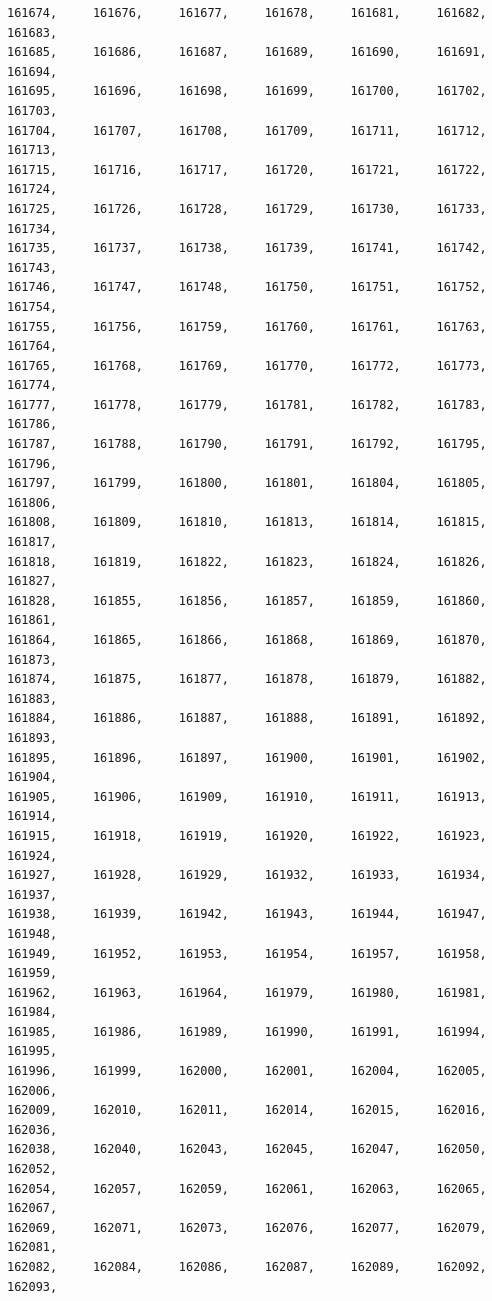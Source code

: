 \documentclass[a4paper,11pt]{report}
\begin{document}
\begin{verbatim}
161674,     161676,     161677,     161678,     161681,     161682,     161683,
161685,     161686,     161687,     161689,     161690,     161691,     161694,
161695,     161696,     161698,     161699,     161700,     161702,     161703,
161704,     161707,     161708,     161709,     161711,     161712,     161713,
161715,     161716,     161717,     161720,     161721,     161722,     161724,
161725,     161726,     161728,     161729,     161730,     161733,     161734,
161735,     161737,     161738,     161739,     161741,     161742,     161743,
161746,     161747,     161748,     161750,     161751,     161752,     161754,
161755,     161756,     161759,     161760,     161761,     161763,     161764,
161765,     161768,     161769,     161770,     161772,     161773,     161774,
161777,     161778,     161779,     161781,     161782,     161783,     161786,
161787,     161788,     161790,     161791,     161792,     161795,     161796,
161797,     161799,     161800,     161801,     161804,     161805,     161806,
161808,     161809,     161810,     161813,     161814,     161815,     161817,
161818,     161819,     161822,     161823,     161824,     161826,     161827,
161828,     161855,     161856,     161857,     161859,     161860,     161861,
161864,     161865,     161866,     161868,     161869,     161870,     161873,
161874,     161875,     161877,     161878,     161879,     161882,     161883,
161884,     161886,     161887,     161888,     161891,     161892,     161893,
161895,     161896,     161897,     161900,     161901,     161902,     161904,
161905,     161906,     161909,     161910,     161911,     161913,     161914,
161915,     161918,     161919,     161920,     161922,     161923,     161924,
161927,     161928,     161929,     161932,     161933,     161934,     161937,
161938,     161939,     161942,     161943,     161944,     161947,     161948,
161949,     161952,     161953,     161954,     161957,     161958,     161959,
161962,     161963,     161964,     161979,     161980,     161981,     161984,
161985,     161986,     161989,     161990,     161991,     161994,     161995,
161996,     161999,     162000,     162001,     162004,     162005,     162006,
162009,     162010,     162011,     162014,     162015,     162016,     162036,
162038,     162040,     162043,     162045,     162047,     162050,     162052,
162054,     162057,     162059,     162061,     162063,     162065,     162067,
162069,     162071,     162073,     162076,     162077,     162079,     162081,
162082,     162084,     162086,     162087,     162089,     162092,     162093,

\end{verbatim}
\end{document}
